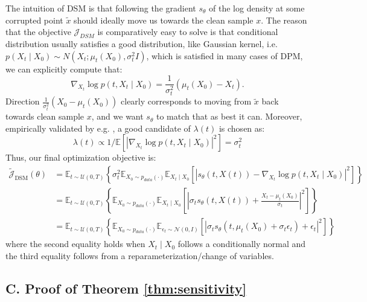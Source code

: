 \documentclass[letterpaper,11pt,reqno]{amsart}
\numberwithin{equation}{section}
\begin{document}
\quad The intuition of DSM is that following the gradient $s_{\theta}$ of the log density at some corrupted point $\tilde{x}$ should ideally move us towards the clean sample $x$. The reason that the objective $\mathcal{J}_{DSM}$ is comparatively easy to solve is that conditional distribution usually satisfies a good distribution, like Gaussian kernel, i.e. $p(X_t \mid X_0) \sim N\left(X_t ; \mu_{t}(X_0), \sigma_t^2 I\right)$, which is satisfied in many cases of DPM, we can explicitly compute that:
$$
\nabla_{X_t} \log p(t,X_t \mid X_0)=\frac{1}{\sigma_t^2}(\mu_{t}(X_0)-X_t) .
$$
Direction $\frac{1}{\sigma_t^2}(X_0-\mu_{t}(X_0))$ clearly corresponds to moving from $\tilde{x}$ back towards clean sample $x$, and we want $s_{\theta}$ to match that as best it can. Moreover,  empirically validated by e.g. \cite{Song20}, a good candidate of $\lambda(t)$ is chosen as:
$$
\lambda(t) \propto 1 / \mathbb{E}\left[\left|\nabla_{X_t} \log p(t,X_t \mid X_0)\right|^2\right]=\sigma_t^2
$$
Thus, our final optimization objective is:
$$
\begin{aligned}
\tilde{\mathcal{J}}_{\text{DSM}}(\theta)&=\mathbb{E}_{t\sim\mathcal{U}(0, T)}\left\{\sigma_t^2 \mathbb{E}_{X_0\sim p_{data}(\cdot)} \mathbb{E}_{X_t \mid X_0}\left[\left|s_{\theta}(t,X(t))-\nabla_{X_t} \log p(t,X_t \mid X_0)\right|^2\right]\right\}\\
& = \mathbb{E}_{t\sim\mathcal{U}(0, T)}\left\{ \mathbb{E}_{X_0\sim p_{data}(\cdot)} \mathbb{E}_{X_t \mid X_0}\left[\left|\sigma_t s_{\theta}(t,X(t))+\frac{X_t-\mu_{t}(X_0)}{\sigma_t}\right|^2\right]\right\}\\
& = \mathbb{E}_{t\sim\mathcal{U}(0, T)}\left\{ \mathbb{E}_{X_0\sim p_{data}(\cdot)} \mathbb{E}_{\epsilon_t\sim\mathcal{N}(0,I)}\left[\left|\sigma_t s_{\theta}(t,\mu_{t}(X_0)+\sigma_t\epsilon_t)+\epsilon_t\right|^2\right]\right\}
\end{aligned}
$$
where the second equality holds when $X_t\mid X_0$ follows a conditionally normal and the third equality follows from a reparameterization/change of variables.


\subsection*{C. Proof of Theorem \ref{thm:sensitivity}}
\end{document}

